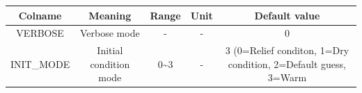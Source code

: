 \documentclass[]{scrbook}
\begin{document}
\begin{longtable}[]{@{}ccccc@{}}
\toprule
\begin{minipage}[b]{0.17\columnwidth}\centering\strut
Colname\strut
\end{minipage} & \begin{minipage}[b]{0.23\columnwidth}\centering\strut
Meaning\strut
\end{minipage} & \begin{minipage}[b]{0.10\columnwidth}\centering\strut
Range\strut
\end{minipage} & \begin{minipage}[b]{0.10\columnwidth}\centering\strut
Unit\strut
\end{minipage} & \begin{minipage}[b]{0.26\columnwidth}\centering\strut
Default value\strut
\end{minipage}\tabularnewline
\midrule
\endhead
\begin{minipage}[t]{0.17\columnwidth}\centering\strut
VERBOSE\strut
\end{minipage} & \begin{minipage}[t]{0.23\columnwidth}\centering\strut
Verbose mode\strut
\end{minipage} & \begin{minipage}[t]{0.10\columnwidth}\centering\strut
-\strut
\end{minipage} & \begin{minipage}[t]{0.10\columnwidth}\centering\strut
-\strut
\end{minipage} & \begin{minipage}[t]{0.26\columnwidth}\centering\strut
0\strut
\end{minipage}\tabularnewline
\begin{minipage}[t]{0.17\columnwidth}\centering\strut
INIT\_MODE\strut
\end{minipage} & \begin{minipage}[t]{0.23\columnwidth}\centering\strut
Initial condition mode\strut
\end{minipage} & \begin{minipage}[t]{0.10\columnwidth}\centering\strut
0\textasciitilde{}3\strut
\end{minipage} & \begin{minipage}[t]{0.10\columnwidth}\centering\strut
-\strut
\end{minipage} & \begin{minipage}[t]{0.26\columnwidth}\centering\strut
3 (0=Relief conditon, 1=Dry condition, 2=Default guess, 3=Warm

\end{minipage}
\end{longtable}
\end{document}

